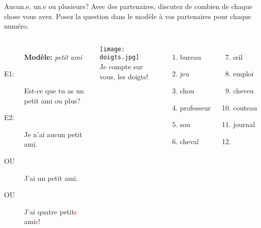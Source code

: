 \begin{frame}{Aucun.e, un.e ou plusieurs?}
  Avec des partenaires, discutez de combien de chaque chose vous avez.
  Posez la question dans le modèle à vos partenaires pour chaque numéro.
  \begin{columns}
      \small
      \begin{description}
        \item[] \textbf{Modèle:} \emph{petit ami}
        \item[E1:] Est-ce que tu as un petit ami ou plus?
        \item[E2:] Je n'ai aucun petit ami.
        \item[OU] J'ai un petit ami.
        \item[OU] J'ai \alert{quatre} petit\textcolor{red}{s} ami\textcolor{red}{s}!
      \end{description}
      \begin{center}
        \texttt{[image: doigts.jpg]} \\
        \tiny
        Je compte sur vous, les doigts!
      \end{center}
      \begin{enumerate}
        \item bureau
        \item jeu
        \item chou
        \item professeur
        \item sou
        \item cheval
      \end{enumerate}
      \begin{enumerate}
        \setcounter{enumi}{6}
        \item œil
        \item emploi
        \item cheveu
        \item couteau
        \item journal
        \item[] \ 
      \end{enumerate}
  \end{columns}
\end{frame}